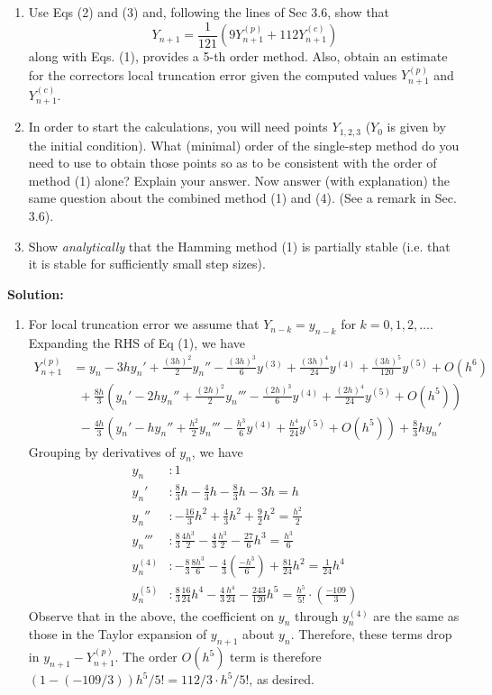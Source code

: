 \documentclass[11pt]{article}
\def\f{\frac }
\newcommand{\oh}[1]{O(h^{{#1}})}
\begin{document}
\begin{enumerate}
\begin{enumerate}
\item Use Eqs (2) and (3) and, following the lines of Sec 3.6, show that
\begin{equation} Y_{n+1} = \f{1}{121} \left ( 9 Y_{n+1} ^{(p)} + 112 Y_{n+1} ^{(c)} \right ) \end{equation}
along with Eqs. (1), provides a 5-th order method.
Also, obtain an estimate for the correctors local truncation error given the computed values $Y_{n+1} ^{(p)}$ and $Y_{n+1} ^{(c)}$.

\item In order to start the calculations, you will need points $Y_{1,2,3}$ ($Y_0$ is given by the initial condition).
What (minimal) order of the single-step method do you need to use to obtain those points so as to be consistent with the order of method (1) alone?
Explain your answer.
Now answer (with explanation) the same question about the combined method (1) and (4).
(See a remark in Sec. 3.6).

\item Show {\em analytically} that the Hamming method (1) is partially stable (i.e. that it is stable for sufficiently small step sizes).
\end{enumerate}

\bigskip
\textbf{Solution:} 
\begin{enumerate}
\item For local truncation error we assume that $Y_{n-k} = y_{n-k}$ for $k=0,1,2,\ldots$.
Expanding the RHS of Eq (1), we have
\begin{align*} Y_{n+1}^{(p)} &= y_n - 3h y_n' + \f{(3h)^2}{2}y_n'' - \f{(3h)^3}{6} y^{(3)}  + \f{(3h)^4}{24} y^{(4)} + \f{(3h)^5}{120} y^{(5)} + \oh{6}\\
&~~+\f{8h}{3} \left ( y_n' - 2h y_n'' + \f{(2h)^2}{2}y_n''' - \f{(2h)^3}{6} y^{(4)}  + \f{(2h)^4}{24} y^{(5)} + \oh{5} \right )\\
&~~-\f{4h}{3} \left ( y_n' - h y_n'' + \f{h^2}{2}y_n''' - \f{h^3}{6} y^{(4)}  + \f{h^4}{24} y^{(5)} + \oh{5} \right ) + \f{8}{3} h y_n'\end{align*}
Grouping by derivatives of $y_n$, we have
\begin{align*} y_n &: 1\\
y_n' &: \f{8}{3}h - \f{4}{3}h - \f{8}{3}h - 3h = h\\
y_n'' &: -\f{16}{3}h^2 + \f{4}{3}h^2 + \f{9}{2}h^2 = \f{h^2}{2}\\
y_n''' &: \f{8}{3}\f{4h^3}{2} - \f{4}{3} \f{h^3}{2} - \f{27}{6}h^3 = \f{h^3}{6}\\
y_n^{(4)} &: -\f{8}{3}\f{8h^3}{6} - \f{4}{3}\left(\f{-h^3}{6}\right) + \f{81}{24}h^2 = \f{1}{24} h^4\\
y_n^{(5)} &: \f{8}{3}\f{16}{24}h^4 - \f{4}{3}\f{h^4}{24} - \f{243}{120}h^5 = \f{h^5}{5!} \cdot \left( \f{-109}{3} \right) \end{align*}
Observe that in the above, the coefficient on $y_n$ through $y_n^{(4)}$ are the same as those in the Taylor expansion of $y_{n+1}$ about $y_n$.
Therefore, these terms drop in $y_{n+1} - Y_{n+1} ^{(p)}$.
The order $\oh{5}$ term is therefore $(1-(-109/3)) h^5/5! = 112/3 \cdot h^5/5!$, as desired.


\end{enumerate}
\end{enumerate}
\end{document}
